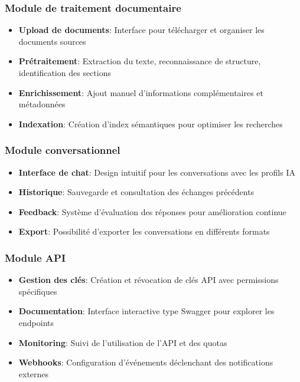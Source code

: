 \subsubsection{Module de traitement documentaire}

\begin{itemize}
  \item \textbf{Upload de documents}: Interface pour télécharger et organiser les documents sources
  
  \item \textbf{Prétraitement}: Extraction du texte, reconnaissance de structure, identification des sections
  
  \item \textbf{Enrichissement}: Ajout manuel d'informations complémentaires et métadonnées
  
  \item \textbf{Indexation}: Création d'index sémantiques pour optimiser les recherches
\end{itemize}

\subsubsection{Module conversationnel}

\begin{itemize}
  \item \textbf{Interface de chat}: Design intuitif pour les conversations avec les profils IA
  
  \item \textbf{Historique}: Sauvegarde et consultation des échanges précédents
  
  \item \textbf{Feedback}: Système d'évaluation des réponses pour amélioration continue
  
  \item \textbf{Export}: Possibilité d'exporter les conversations en différents formats
\end{itemize}

\subsubsection{Module API}

\begin{itemize}
  \item \textbf{Gestion des clés}: Création et révocation de clés API avec permissions spécifiques
  
  \item \textbf{Documentation}: Interface interactive type Swagger pour explorer les endpoints
  
  \item \textbf{Monitoring}: Suivi de l'utilisation de l'API et des quotas
  
  \item \textbf{Webhooks}: Configuration d'événements déclenchant des notifications externes
\end{itemize}

